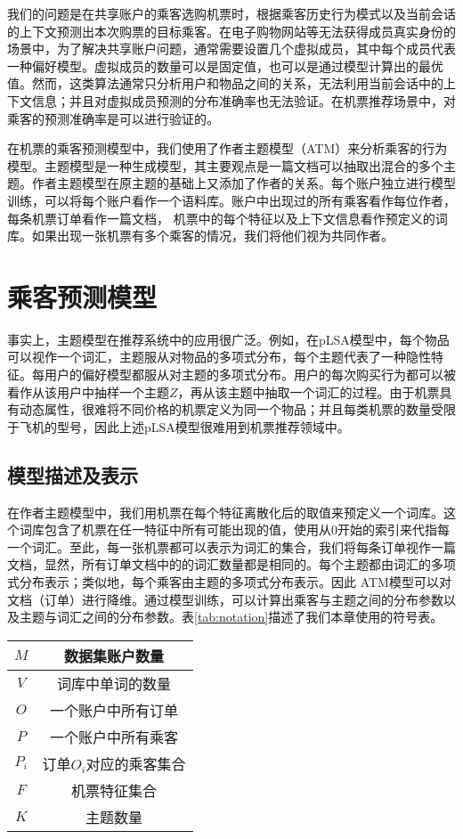 我们的问题是在共享账户的乘客选购机票时，根据乘客历史行为模式以及当前会话的上下文预测出本次购票的目标乘客。在电子购物网站等无法获得成员真实身份的场景中，为了解决共享账户问题，通常需要设置几个虚拟成员，其中每个成员代表一种偏好模型。虚拟成员的数量可以是固定值，也可以是通过模型计算出的最优值。然而，这类算法通常只分析用户和物品之间的关系，无法利用当前会话中的上下文信息；并且对虚拟成员预测的分布准确率也无法验证。在机票推荐场景中，对乘客的预测准确率是可以进行验证的。

在机票的乘客预测模型中，我们使用了作者主题模型（ATM）来分析乘客的行为模型。主题模型是一种生成模型，其主要观点是一篇文档可以抽取出混合的多个主题。作者主题模型在原主题的基础上又添加了作者的关系。每个账户独立进行模型训练，可以将每个账户看作一个语料库。账户中出现过的所有乘客看作每位作者，每条机票订单看作一篇文档， 机票中的每个特征以及上下文信息看作预定义的词库。如果出现一张机票有多个乘客的情况，我们将他们视为共同作者。

\section{乘客预测模型}
事实上，主题模型在推荐系统中的应用很广泛。例如，在pLSA模型中，每个物品可以视作一个词汇，主题服从对物品的多项式分布，每个主题代表了一种隐性特征。每用户的偏好模型都服从对主题的多项式分布。用户的每次购买行为都可以被看作从该用户中抽样一个主题$Z$，再从该主题中抽取一个词汇的过程。由于机票具有动态属性，很难将不同价格的机票定义为同一个物品；并且每类机票的数量受限于飞机的型号，因此上述pLSA模型很难用到机票推荐领域中。

\subsection{模型描述及表示}

在作者主题模型中，我们用机票在每个特征离散化后的取值来预定义一个词库。这个词库包含了机票在任一特征中所有可能出现的值，使用从0开始的索引来代指每一个词汇。至此，每一张机票都可以表示为词汇的集合，我们将每条订单视作一篇文档，显然，所有订单文档中的的词汇数量都是相同的。每个主题都由词汇的多项式分布表示；类似地，每个乘客由主题的多项式分布表示。因此
ATM模型可以对文档（订单）进行降维。通过模型训练，可以计算出乘客与主题之间的分布参数以及主题与词汇之间的分布参数。表\ref{tab:notation}描述了我们本章使用的符号表。

\begin{table}[!hpb]
\centering
\begin{tabular}{|c|c|} \hline
$M$ & 数据集账户数量\\ \hline
$V$ & 词库中单词的数量\\ \hline
$O$ & 一个账户中所有订单\\ \hline
$P$ & 一个账户中所有乘客\\ \hline
$P_i$ & 订单$O_i$对应的乘客集合 \\ \hline
$F$ & 机票特征集合\\ \hline
$K$ & 主题数量\\ \hline
\end{tabular}
\end{table}

